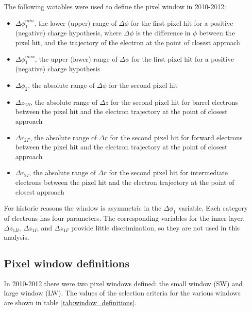 The following variables were used to define the pixel window in 2010-2012:
\begin{itemize}
  \item $\Delta\phi_1^{min}$, the lower (upper) range of $\Delta\phi$ for the first pixel hit for a positive (negative) charge hypothesis, where $\Delta\phi$ is the difference in $\phi$ between the pixel hit, and the trajectory of the electron at the point of closest approach
  \item $\Delta\phi_1^{max}$, the upper (lower) range of $\Delta\phi$ for the first pixel hit for a positive (negative) charge hypothesis
  \item $\Delta\phi_2$, the absolute range of $\Delta\phi$ for the second pixel hit
  \item $\Delta z_{2B}$, the absolute range of $\Delta z$ for the second pixel hit for barrel electrons between the pixel hit and the electron trajectory at the point of closest approach
  \item $\Delta r_{2F}$, the absolute range of $\Delta r$ for the second pixel hit for forward electrons between the pixel hit and the electron trajectory at the point of closest approach
  \item $\Delta r_{2I}$, the absolute range of $\Delta r$ for the second pixel hit for intermediate electrons between the pixel hit and the electron trajectory at the point of closest approach
\end{itemize}

For historic reasons the window is asymmetric in the $\Delta\phi_1$ variable.  Each category of electrons has four parameters.  The corresponding variables for the inner layer, $\Delta z_{1B}$, $\Delta z_{1I}$, and $\Delta z_{1F}$ provide little discrimination, so they are not used in this analysis.

\subsection{Pixel window definitions}

In 2010-2012 there were two pixel windows defined: the small window (SW) and large window (LW).  The values of the selection criteria for the various windows are shown in table \ref{tab:window_definitions}.

